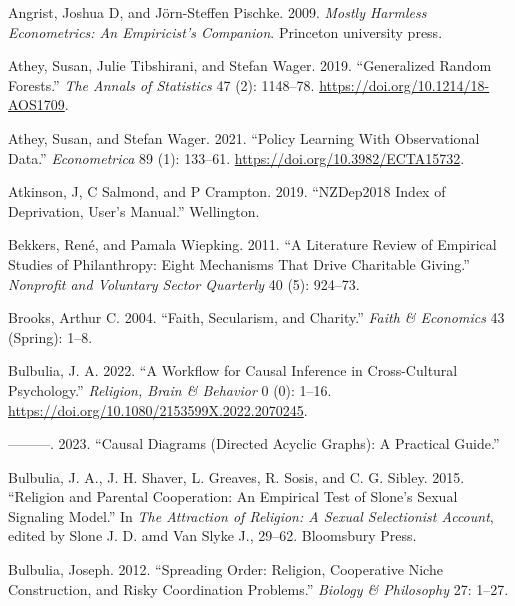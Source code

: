 \documentclass[
  single column]{article}
\newlength{\cslhangindent}
\newenvironment{CSLReferences}[2] %
 {\begin{list}{}{%
  \setlength{\itemindent}{0pt}
  \setlength{\leftmargin}{0pt}
  \setlength{\parsep}{0pt}
  \ifodd #1
   \setlength{\leftmargin}{\cslhangindent}
   \setlength{\itemindent}{-1\cslhangindent}
  \fi
  \setlength{\itemsep}{#2\baselineskip}}}
 {\end{list}}
\begin{document}
\label{refs}
\begin{CSLReferences}{1}{0}
Angrist, Joshua D, and Jörn-Steffen Pischke. 2009. \emph{Mostly Harmless
Econometrics: An Empiricist's Companion}. Princeton university press.

Athey, Susan, Julie Tibshirani, and Stefan Wager. 2019. {``Generalized
Random Forests.''} \emph{The Annals of Statistics} 47 (2): 1148--78.
\url{https://doi.org/10.1214/18-AOS1709}.

Athey, Susan, and Stefan Wager. 2021. {``Policy Learning With
Observational Data.''} \emph{Econometrica} 89 (1): 133--61.
\url{https://doi.org/10.3982/ECTA15732}.

Atkinson, J, C Salmond, and P Crampton. 2019. {``NZDep2018 Index of
Deprivation, User{'}s Manual.''} Wellington.

Bekkers, René, and Pamala Wiepking. 2011. {``A Literature Review of
Empirical Studies of Philanthropy: Eight Mechanisms That Drive
Charitable Giving.''} \emph{Nonprofit and Voluntary Sector Quarterly} 40
(5): 924--73.

Brooks, Arthur C. 2004. {``Faith, Secularism, and Charity.''}
\emph{Faith \& Economics} 43 (Spring): 1--8.

Bulbulia, J. A. 2022. {``A Workflow for Causal Inference in
Cross-Cultural Psychology.''} \emph{Religion, Brain \& Behavior} 0 (0):
1--16. \url{https://doi.org/10.1080/2153599X.2022.2070245}.

---------. 2023. {``Causal Diagrams (Directed Acyclic Graphs): A
Practical Guide.''}

Bulbulia, J. A., J. H. Shaver, L. Greaves, R. Sosis, and C. G. Sibley.
2015. {``Religion and Parental Cooperation: An Empirical Test of Slone's
Sexual Signaling Model.''} In \emph{The Attraction of Religion: A Sexual
Selectionist Account}, edited by Slone J. D. amd Van Slyke J., 29--62.
Bloomsbury Press.

Bulbulia, Joseph. 2012. {``Spreading Order: Religion, Cooperative Niche
Construction, and Risky Coordination Problems.''} \emph{Biology \&
Philosophy} 27: 1--27.


\end{CSLReferences}
\end{document}
